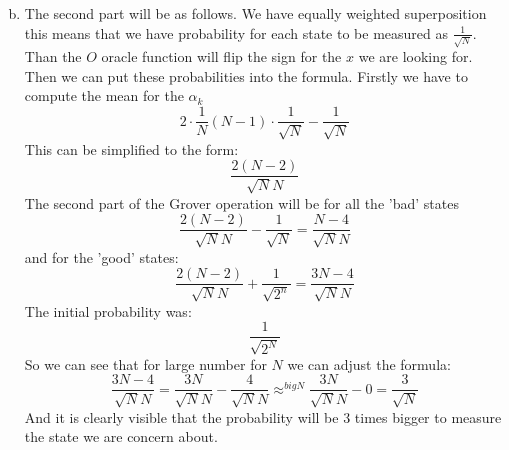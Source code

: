 \documentclass[a4paper,10pt]{article}
\newcommand{\al}{\ensuremath{\alpha}}
\begin{document}
\begin{enumerate}[a)]
$$$$
\item The second part will be as follows. We have equally weighted superposition this means that we have probability for each state to be measured as $\frac{1}{\sqrt{N}}$. Than the $O$ oracle function will flip the sign for the $x$ we are looking for. \\
Then we can put these probabilities into the formula.
Firstly we have to compute the mean for the $\al_k$
$$
2\cdot\frac{1}{N}\left(N-1\right)\cdot\frac{1}{\sqrt{N}}-\frac{1}{\sqrt{N}}
$$
This can be simplified to the form:
$$
\frac{2 (N-2)}{\sqrt{N} N}
$$
The second part of the Grover operation will be for all the 'bad' states
$$
\frac{2 (N-2)}{\sqrt{N} N}-\frac{1}{\sqrt{N}} = \frac{N-4}{\sqrt{N} N}
$$
and for the 'good' states:
$$
\frac{2 (N-2)}{\sqrt{N} N}+\frac{1}{\sqrt{2^n}} = 
\frac{3 N-4}{\sqrt{N} N}
$$
The initial probability was:
$$
\frac{1}{\sqrt{2^N}}
$$
So we can see that for large number for $N$ we can adjust the formula:
$$
\frac{3 N-4}{\sqrt{N} N}=
\frac{3 N}{\sqrt{N} N}-\frac{4}{\sqrt{N} N} \approx^{big N} \frac{3N}{\sqrt{N}N}-0=\frac{3}{\sqrt{N}}
$$
And it is clearly visible that the probability will be 3 times bigger to measure the state we are concern about.
\end{enumerate}
\end{document}

